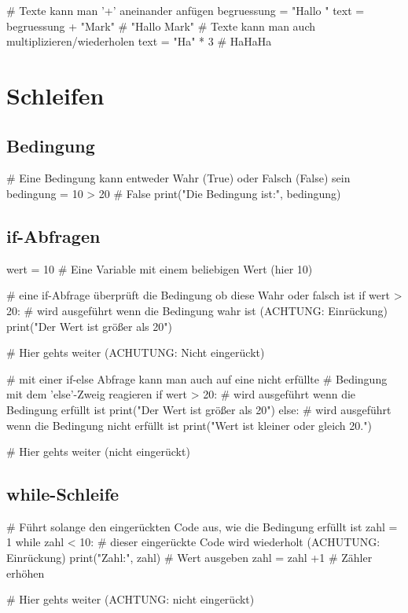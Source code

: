 \documentclass{\VorlagenPfad/coderdojokatext}
\begin{document}
\begin{pythoncode}
# Texte kann man '+' aneinander anfügen
begruessung  = "Hallo "
text = begruessung + "Mark" # "Hallo Mark"
# Texte kann man auch multiplizieren/wiederholen
text = "Ha" * 3  # HaHaHa
\end{pythoncode}

\section{Schleifen}

\subsection{Bedingung}
\begin{pythoncode}
# Eine Bedingung kann entweder Wahr (True) oder Falsch (False) sein
bedingung = 10 > 20 # False
print("Die Bedingung ist:", bedingung)
\end{pythoncode}

\subsection{if-Abfragen}
\begin{pythoncode}
wert = 10 # Eine Variable mit einem beliebigen Wert (hier 10)

# eine if-Abfrage überprüft die Bedingung ob diese Wahr oder falsch ist
if wert > 20: 
	# wird ausgeführt wenn die Bedingung wahr ist (ACHTUNG: Einrückung)
	print("Der Wert ist größer als 20")

# Hier gehts weiter (ACHUTUNG: Nicht eingerückt)
\end{pythoncode}

\begin{pythoncode}
# mit einer if-else Abfrage kann man auch auf eine nicht erfüllte
# Bedingung mit dem 'else'-Zweig reagieren
if wert > 20: 
	# wird ausgeführt wenn die Bedingung erfüllt ist
	print("Der Wert ist größer als 20") 
else:
	# wird ausgeführt wenn die Bedingung nicht erfüllt ist
	print("Wert ist kleiner oder gleich 20.")

# Hier gehts weiter (nicht eingerückt)
\end{pythoncode}

\subsection{while-Schleife}
\begin{pythoncode}
# Führt solange den eingerückten Code aus, wie die Bedingung erfüllt ist
zahl = 1
while zahl < 10: 
	# dieser eingerückte Code wird wiederholt (ACHUTUNG: Einrückung)
	print("Zahl:", zahl) # Wert ausgeben
	zahl = zahl +1 # Zähler erhöhen

# Hier gehts weiter (ACHTUNG: nicht eingerückt)
\end{pythoncode}
\end{document}
